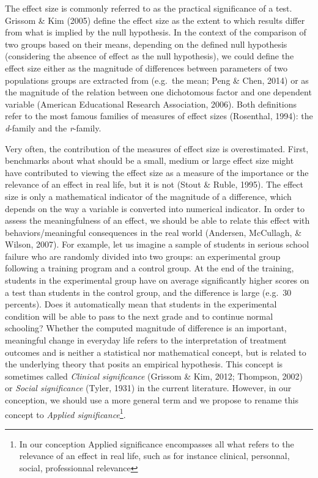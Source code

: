 \documentclass[
  man,floatsintext]{apa6}
\begin{document}
The effect size is commonly referred to as the practical significance of a test. Grissom \& Kim (2005) define the effect size as the extent to which results differ from what is implied by the null hypothesis. In the context of the comparison of two groups based on their means, depending on the defined null hypothesis (considering the absence of effect as the null hypothesis), we could define the effect size either as the magnitude of differences between parameters of two populations groups are extracted from (e.g.~the mean; Peng \& Chen, 2014) or as the magnitude of the relation between one dichotomous factor and one dependent variable (American Educational Research Association, 2006). Both definitions refer to the most famous families of measures of effect sizes (Rosenthal, 1994): the \emph{d}-family and the \emph{r}-family.

Very often, the contribution of the measures of effect size is overestimated. First, benchmarks about what should be a small, medium or large effect size might have contributed to viewing the effect size as a measure of the importance or the relevance of an effect in real life, but it is not (Stout \& Ruble, 1995). The effect size is only a mathematical indicator of the magnitude of a difference, which depends on the way a variable is converted into numerical indicator. In order to assess the meaningfulness of an effect, we should be able to relate this effect with behaviors/meaningful consequences in the real world (Andersen, McCullagh, \& Wilson, 2007). For example, let us imagine a sample of students in serious school failure who are randomly divided into two groups: an experimental group following a training program and a control group. At the end of the training, students in the experimental group have on average significantly higher scores on a test than students in the control group, and the difference is large (e.g.~30 percents). Does it automatically mean that students in the experimental condition will be able to pass to the next grade and to continue normal schooling? Whether the computed magnitude of difference is an important, meaningful change in everyday life refers to the interpretation of treatment outcomes and is neither a statistical nor mathematical concept, but is related to the underlying theory that posits an empirical hypothesis. This concept is sometimes called \emph{Clinical significance} (Grissom \& Kim, 2012; Thompson, 2002) or \emph{Social significance} (Tyler, 1931) in the current literature. However, in our conception, we should use a more general term and we propose to rename this concept to \emph{Applied significance}\footnote{In our conception Applied significance encompasses all what refers to the relevance of an effect in real life, such as for instance clinical, personnal, social, professionnal relevance}.
\end{document}
